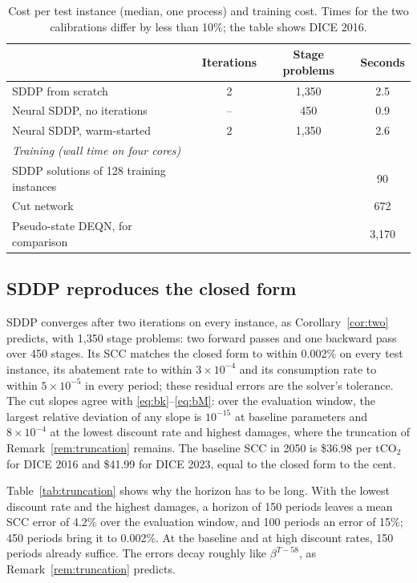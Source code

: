 \begin{table}[t]
\centering
\caption{Cost per test instance (median, one process) and training cost. Times for the two calibrations differ by less than 10\%; the table shows DICE 2016.}
\label{tab:cost}
\begin{tabular}{lccc}
\toprule
 & Iterations & Stage problems & Seconds \\
\midrule
SDDP from scratch & 2 & 1{,}350 & 2.5 \\
Neural SDDP, no iterations & -- & 450 & 0.9 \\
Neural SDDP, warm-started & 2 & 1{,}350 & 2.6 \\
\midrule
\multicolumn{4}{l}{\textit{Training (wall time on four cores)}} \\
SDDP solutions of 128 training instances & & & 90 \\
Cut network & & & 672 \\
Pseudo-state DEQN, for comparison & & & 3{,}170 \\
\bottomrule
\end{tabular}
\end{table}

\subsection{SDDP reproduces the closed form}

SDDP converges after two iterations on every instance, as Corollary~\ref{cor:two} predicts, with 1{,}350 stage problems: two forward passes and one backward pass over 450 stages. Its SCC matches the closed form to within 0.002\% on every test instance, its abatement rate to within $3 \times 10^{-4}$ and its consumption rate to within $5 \times 10^{-5}$ in every period; these residual errors are the solver's tolerance. The cut slopes agree with \eqref{eq:bk}--\eqref{eq:bM}: over the evaluation window, the largest relative deviation of any slope is $10^{-15}$ at baseline parameters and $8 \times 10^{-4}$ at the lowest discount rate and highest damages, where the truncation of Remark~\ref{rem:truncation} remains. The baseline SCC in 2050 is \$36.98 per tCO$_2$ for DICE 2016 and \$41.99 for DICE 2023, equal to the closed form to the cent.

Table~\ref{tab:truncation} shows why the horizon has to be long. With the lowest discount rate and the highest damages, a horizon of 150 periods leaves a mean SCC error of 4.2\% over the evaluation window, and 100 periods an error of 15\%; 450 periods bring it to 0.002\%. At the baseline and at high discount rates, 150 periods already suffice. The errors decay roughly like $\beta^{T-58}$, as Remark~\ref{rem:truncation} predicts.

